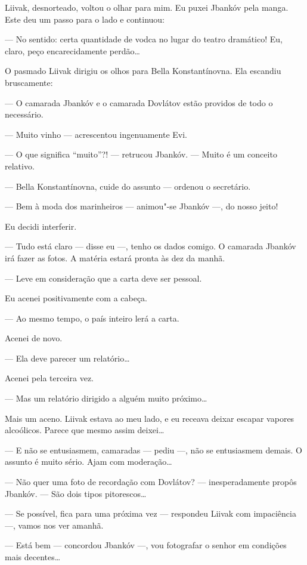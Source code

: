 Liivak, desnorteado, voltou o olhar para mim. Eu puxei Jbankóv pela
manga. Este deu um passo para o lado e continuou:

--- No sentido: certa quantidade de vodca no lugar do teatro
dramático! Eu, claro, peço encarecidamente perdão\ldots{}

O pasmado Liivak dirigiu os olhos para Bella Konstantínovna. Ela
escandiu bruscamente:

--- O camarada Jbankóv e o camarada Dovlátov estão providos de
todo o necessário.

--- Muito vinho --- acrescentou ingenuamente Evi.

--- O que significa ``muito''?! --- retrucou Jbankóv.
--- Muito é um conceito relativo.

--- Bella Konstantínovna, cuide do assunto --- ordenou o
secretário.

--- Bem à moda dos marinheiros --- animou"-se Jbankóv ---, do nosso jeito!

Eu decidi interferir.

--- Tudo está claro --- disse eu ---, tenho os
dados comigo. O camarada Jbankóv irá fazer as fotos. A matéria estará
pronta às dez da manhã.

--- Leve em consideração que a carta deve ser pessoal.

Eu acenei positivamente com a cabeça.

--- Ao mesmo tempo, o país inteiro lerá a carta.

Acenei de novo.

--- Ela deve parecer um relatório\ldots{}

Acenei pela terceira vez.

--- Mas um relatório dirigido a alguém muito próximo\ldots{}

Mais um aceno. Liivak estava ao meu lado, e eu receava deixar escapar
vapores alcoólicos. Parece que mesmo assim deixei\ldots{}

--- E não se entusiasmem, camaradas --- pediu ---,
não se entusiasmem demais. O assunto é muito sério. Ajam com
moderação\ldots{}

--- Não quer uma foto de recordação com Dovlátov? ---
inesperadamente propôs Jbankóv. --- São dois tipos pitorescos\ldots{}

--- Se possível, fica para uma próxima vez --- respondeu
Liivak com impaciência ---, vamos nos ver amanhã.

--- Está bem --- concordou Jbankóv ---, vou
fotografar o senhor em condições mais decentes\ldots{}

